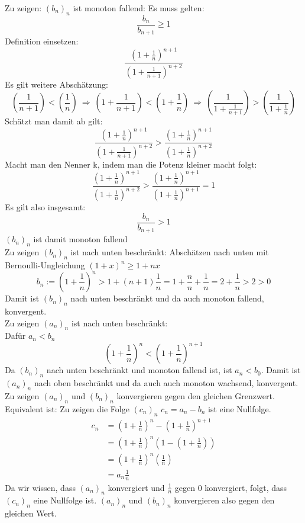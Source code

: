 \documentclass{article}
\begin{document}
    Zu zeigen: \( {(b_n)}_n \) ist monoton fallend:
    Es muss gelten:
    \[ \frac{ b_n }{ b_{n+1} } \geq 1 \]
    Definition einsetzen:
    \[ \frac{ {\left( 1 + \frac{1}{n} \right)}^{n+1} }{ {\left( 1 + \frac{1}{n+1} \right)}^{n+2} } \]
    Es gilt weitere Abschätzung:
    \[ 
        \left( \frac{1}{n+1} \right) < \left( \frac{1}{n} \right)
        \ \Rightarrow \ \left( 1 + \frac{1}{n+1} \right) < \left( 1 + \frac{1}{n} \right)
        \ \Rightarrow \ \left( \frac{1}{ 1 + \frac{1}{n+1} } \right) > \left( \frac{1}{ 1 + \frac{1}{n} } \right)
    \]
    Schätzt man damit ab gilt:
    \[
        \frac{ {\left( 1 + \frac{1}{n} \right)}^{n+1} }{ {\left( 1 + \frac{1}{n+1} \right)}^{n+2} } >
        \frac{ {\left( 1 + \frac{1}{n} \right)}^{n+1} }{ {\left( 1 + \frac{1}{n} \right)}^{n+2} }
    \]
    Macht man den Nenner k, indem man die Potenz kleiner macht folgt:
    \[
        \frac{ {\left( 1 + \frac{1}{n} \right)}^{n+1} }{ {\left( 1 + \frac{1}{n} \right)}^{n+2} } >
        \frac{ {\left( 1 + \frac{1}{n} \right)}^{n+1} }{ {\left( 1 + \frac{1}{n} \right)}^{n+1} } = 1
    \]
    Es gilt also insgesamt:
    \[
        \frac{ b_n }{ b_{n+1} } > 1
    \]
    \( {(b_n)}_n \) ist damit monoton fallend \\

    Zu zeigen \({(b_n)}_n\) ist nach unten beschränkt:
    Abschätzen nach unten mit Bernoulli-Ungleichung \({(1+x)}^n \geq 1 + nx\)
    \[ 
        b_n := { \left( 1 + \frac{1}{n} \right) }^n >
        1 + (n+1) \frac{1}{n} = 
        1 + \frac{n}{n} + \frac{1}{n} =
        2 + \frac{1}{n} > 2 > 0
    \]
    Damit ist \({(b_n)}_n\) nach unten beschränkt und da auch monoton fallend, konvergent. \\
    
    Zu zeigen \({(a_n)}_n\) ist nach unten beschränkt: \\
    Dafür \(a_n < b_n\)
    \[ { \left( 1 + \frac{1}{n} \right) }^n < { \left( 1 + \frac{1}{n} \right) }^{n+1} \]
    Da \({(b_n)}_n\) nach unten beschränkt und monoton fallend ist, ist \(a_n < b_0\).
    Damit ist \({(a_n)}_n\) nach oben beschränkt und da auch auch monoton wachsend, konvergent. \\

    Zu zeigen \({(a_n)}_n\) und \({(b_n)}_n\) konvergieren gegen den gleichen Grenzwert. \\
    Equivalent ist: Zu zeigen die Folge \({(c_n)}_n\) \(c_n = a_n - b_n\) ist eine Nullfolge.
    \begin{align*}
        c_n &= { \left( 1 + \frac{1}{n} \right) }^n - { \left( 1 + \frac{1}{n} \right) }^{n+1} \\
        &= { \left( 1 + \frac{1}{n} \right) }^n \left( 1 - \left( 1 + \frac{1}{n} \right) \right) \\
        &= { \left( 1 + \frac{1}{n} \right) }^n \left( \frac{1}{n} \right) \\
        &= a_n \frac{1}{n}
    \end{align*}
    Da wir wissen, dass \({(a_n)}_n\) konvergiert und \(\frac{1}{n}\) gegen 0 konvergiert, folgt, dass \({(c_n)_n}\)
    eine Nullfolge ist. \({(a_n)}_n\) und \({(b_n)}_n\) konvergieren also gegen den gleichen Wert.
    
\end{document}
